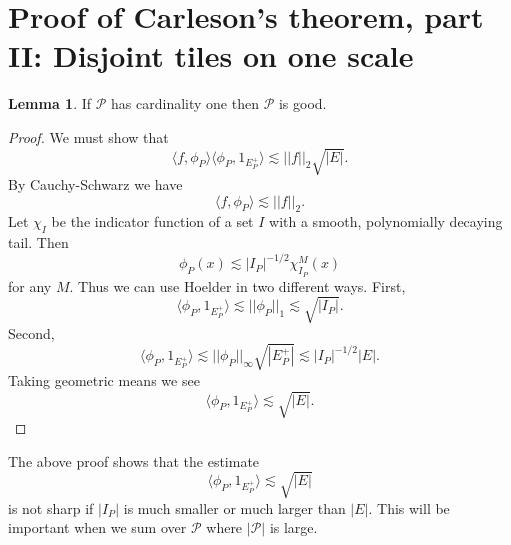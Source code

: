 \documentclass[12pt]{report}
\theoremstyle{definition}
\newtheorem{lemma}[theorem]{Lemma}
\begin{document}
\section{Proof of Carleson's theorem, part II: Disjoint tiles on one scale}
\begin{lemma}
If $\mathcal P$ has cardinality one then $\mathcal P$ is good.
\end{lemma}
\begin{proof}
We must show that
$$\langle f, \phi_P\rangle\langle \phi_P, 1_{E_P^+}\rangle \lesssim ||f||_2 \sqrt{|E|}.$$
By Cauchy-Schwarz we have
$$\langle f, \phi_P\rangle \lesssim ||f||_2.$$
Let $\chi_I$ be the indicator function of a set $I$ with a smooth, polynomially decaying tail.
Then
$$\phi_P(x) \lesssim |I_P|^{-1/2}\chi_{I_P}^M(x)$$
for any $M$. Thus we can use Hoelder in two different ways.
First,
$$\langle \phi_P, 1_{E_P^+}\rangle \lesssim ||\phi_P||_1 \lesssim \sqrt{|I_P|}.$$
Second,
$$\langle \phi_P, 1_{E_P^+}\rangle \lesssim ||\phi_P||_\infty \sqrt{|E_P^+|} \lesssim |I_P|^{-1/2}|E|.$$
Taking geometric means we see
$$\langle \phi_P, 1_{E_P^+}\rangle \lesssim \sqrt{|E|}.$$
\end{proof}
The above proof shows that the estimate
$$\langle \phi_P, 1_{E_P^+}\rangle \lesssim \sqrt{|E|}$$
is not sharp if $|I_P|$ is much smaller or much larger than $|E|$. This will be important when we sum over $\mathcal P$ where $|\mathcal P|$ is large.
\end{document}
